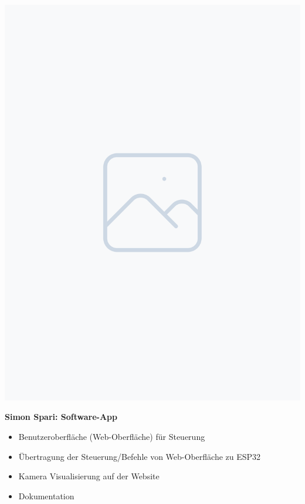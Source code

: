 \documentclass[ngerman,12pt,a4paper]{article}
\begin{document}
\begin{center}
			\begin{minipage}{0.2\textwidth}
				\includegraphics[width=\linewidth]{Pictures/placeholder}
				\label{fig:simon}
			\end{minipage}
			\hfill
			\begin{minipage}{0.65\textwidth}
				\vspace{-20pt}
				\textbf{Simon Spari: Software-App}
				\begin{itemize}
					\item Benutzeroberfläche (Web-Oberfläche) für Steuerung \vspace{-10pt}
					\item Übertragung der Steuerung/Befehle von Web-Oberfläche zu ESP32 \vspace{-10pt}
					\item Kamera Visualisierung auf der Website
					\item Dokumentation \vspace{-10pt}

\end{itemize}
\end{minipage}
\end{center}
\end{document}
